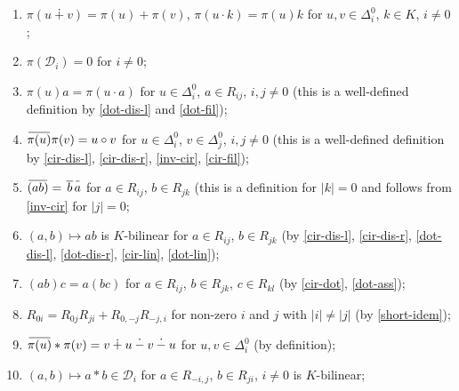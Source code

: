 \documentclass{article}
\theoremstyle{definition}
\newcommand{\dotminus}{\mathbin{\dot{-}}}
\newcommand{\inv}[1]{
    \!\;\overline{
        \!\!\:#1\vphantom !\!\!\:
    }\;\!
}
\begin{document}
\begin{enumerate}[label = {(Z\arabic*)}]

    \item \label{pi-lin} \(
        \pi(u \dotplus v) = \pi(u) + \pi(v)
    \), \(
        \pi(u \cdot k) = \pi(u) k
    \) for \(u, v \in \Delta^0_i\), \(k \in K\), \(i \neq 0\);

    \item \label{pi-aug} \(
        \pi(\mathcal D_i) = 0
    \) for \(i \neq 0\);

    \item \label{pi-dot} \(
        \pi(u) a = \pi(u \cdot a)
    \) for \(u \in \Delta^0_i\), \(a \in R_{ij}\), \(i, j \neq 0\) (this is a well-defined definition by \ref{dot-dis-l} and \ref{dot-fil});

    \item \label{mul-pi} \(
        \inv{\pi(u)} \pi(v) = u \circ v
    \) for \(u \in \Delta^0_i\), \(v \in \Delta^0_j\), \(i, j \neq 0\) (this is a well-defined definition by \ref{cir-dis-l}, \ref{cir-dis-r}, \ref{inv-cir}, \ref{cir-fil});

    \item \label{inv-mul-2} \(
        \inv{(ab)} = \inv{\,b\,} \inv a
    \) for \(a \in R_{ij}\), \(b \in R_{jk}\) (this is a definition for \(|k| = 0\) and follows from \ref{inv-cir} for \(|j| = 0\);

    \item \label{mul-lin-2} \(
        (a, b) \mapsto ab
    \) is \(K\)-bilinear for \(a \in R_{ij}\), \(b \in R_{jk}\) (by \ref{cir-dis-l}, \ref{cir-dis-r}, \ref{dot-dis-l}, \ref{dot-dis-r}, \ref{cir-lin}, \ref{dot-lin});

    \item \label{mul-ass-2} \(
        (ab)c = a(bc)
    \) for \(a \in R_{ij}\), \(b \in R_{jk}\), \(c \in R_{kl}\) (by \ref{cir-dot}, \ref{dot-ass});

    \item \label{half-idem} \(
        R_{0i} = R_{0j} R_{ji} + R_{0, -j} R_{-j, i}
    \) for non-zero \(i\) and \(j\) with \(|i| \neq |j|\) (by \ref{short-idem});

    \item \label{str-pi} \(
        \inv{\pi(u)} * \pi(v)
        =
        v \dotplus u \dotminus v \dotminus u
    \) for \(u, v \in \Delta^0_i\) (by definition);

    \item \label{str-lin-2} \(
        (a, b) \mapsto a * b \in \mathcal D_i
    \) for \(a \in R_{-i, j}\), \(b \in R_{ji}\), \(i \neq 0\) is \(K\)-bilinear;


\end{enumerate}
\end{document}
